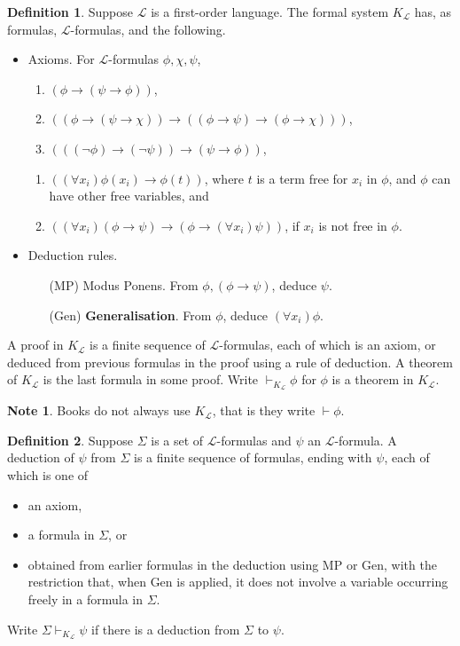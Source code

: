 \documentclass{article}
\renewcommand{\L}{\mathcal{L}}
\newcommand{\rb}[1]{\left( #1 \right)}
\newcommand{\notb}[1]{\rb{\neg #1}}
\newcommand{\impb}[2]{\rb{#1 \rightarrow #2}}
\newcommand{\fab}[1]{\rb{\forall #1}}
\theoremstyle{definition}\newtheorem{definition}{Definition}[subsection]
\theoremstyle{definition}\newtheorem{remark1}[definition]{Remark}
\theoremstyle{definition}\newtheorem{example1}[definition]{Example}
\theoremstyle{definition}\newtheorem*{remark2}{Remark}
\theoremstyle{definition}\newtheorem*{example2}{Example}
\theoremstyle{definition}\newtheorem*{note}{Note}
\theoremstyle{definition}\newtheorem*{notation}{Notation}
\begin{document}
\begin{definition}
Suppose $ \L $ is a first-order language. The formal system $ K_{\L} $ has, as formulas, $ \L $-formulas, and the following.
\begin{itemize}
\item Axioms. For $ \L $-formulas $ \phi, \chi, \psi $,
\begin{enumerate}[label=(A\arabic*)]
\item $ \impb{\phi}{\impb{\psi}{\phi}} $,
\item $ \impb{\impb{\phi}{\impb{\psi}{\chi}}}{\impb{\impb{\phi}{\psi}}{\impb{\phi}{\chi}}} $,
\item $ \impb{\impb{\notb{\phi}}{\notb{\psi}}}{\impb{\psi}{\phi}} $,
\end{enumerate}
\begin{enumerate}[label=(K\arabic*)]
\item $ \impb{\fab{x_i}\phi\rb{x_i}}{\phi\rb{t}} $, where $ t $ is a term free for $ x_i $ in $ \phi $, and $ \phi $ can have other free variables, and
\item $ \impb{\fab{x_i}\impb{\phi}{\psi}}{\impb{\phi}{\fab{x_i}\psi}} $, if $ x_i $ is not free in $ \phi $.
\end{enumerate}
\item Deduction rules.
\begin{itemize}
\item[(MP)] Modus Ponens. From $ \phi, \impb{\phi}{\psi} $, deduce $ \psi $.
\item[(Gen)] \textbf{Generalisation}. From $ \phi $, deduce $ \fab{x_i}\phi $.
\end{itemize}
\end{itemize}
A proof in $ K_{\L} $ is a finite sequence of $ \L $-formulas, each of which is an axiom, or deduced from previous formulas in the proof using a rule of deduction. A theorem of $ K_{\L} $ is the last formula in some proof. Write $ \vdash_{K_{\L}} \phi $ for $ \phi $ is a theorem in $ K_{\L} $.
\end{definition}

\begin{note}
Books do not always use $ K_{\L} $, that is they write $ \vdash \phi $.
\end{note}

\pagebreak

\begin{definition}
Suppose $ \Sigma $ is a set of $ \L $-formulas and $ \psi $ an $ \L $-formula. A deduction of $ \psi $ from $ \Sigma $ is a finite sequence of formulas, ending with $ \psi $, each of which is one of
\begin{itemize}
\item an axiom,
\item a formula in $ \Sigma $, or
\item obtained from earlier formulas in the deduction using MP or Gen, with the restriction that, when Gen is applied, it does not involve a variable occurring freely in a formula in $ \Sigma $.
\end{itemize}
Write $ \Sigma \vdash_{K_{\L}} \psi $ if there is a deduction from $ \Sigma $ to $ \psi $.
\end{definition}
\end{document}
